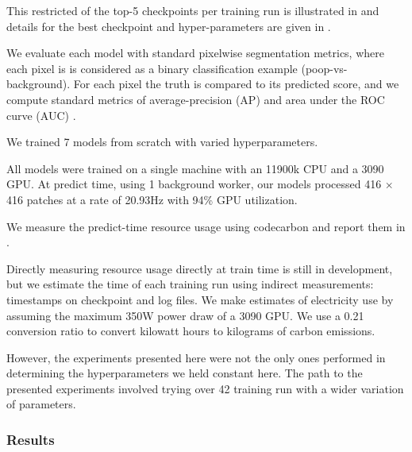 \documentclass[10pt,twocolumn,letterpaper]{article}
\newcommand{\cotwo}{\ensuremath{\mathrm{CO_2}}}
\begin{document}
This restricted of the top-5 checkpoints per training run is illustrated in  and details for the best checkpoint and hyper-parameters are given in .

We evaluate each model with standard pixelwise segmentation metrics, where each
pixel is is considered as a binary classification example (poop-vs-background).
For each pixel the truth is compared to its predicted score, and we compute
standard metrics of average-precision (AP) and  area under the ROC curve (AUC)
\cite{powers_evaluation_2011}.



We trained 7 models from scratch with varied hyperparameters.

All models were trained on a single machine with an 11900k CPU and a 3090 GPU.
At predict time, using 1 background worker, our models processed 416 $\times$
416 patches at a rate of 20.93Hz with 94\% GPU utilization.

We measure the predict-time resource usage using codecarbon
\cite{lacoste2019codecarbon} and report them in .


Directly measuring resource usage directly at train time is still in
development, but we estimate the time of each training run using indirect
measurements: timestamps on checkpoint and log files. We make estimates of
electricity use by assuming the maximum 350W power draw of a 3090 GPU.
We use a 0.21 conversion ratio to convert kilowatt hours to kilograms of carbon
emissions.

However, the experiments presented here were not the only ones performed in
determining the hyperparameters we held constant here. 
The path to the presented experiments involved trying over 42 training run with
a wider variation of parameters. 


\subsubsection{Results}
\end{document}
